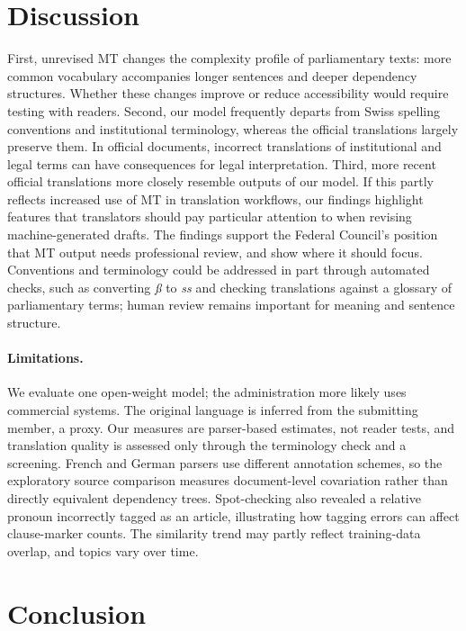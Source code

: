 \documentclass[11pt,a4paper]{article}
\begin{document}
\section{Discussion}
\label{sec:discussion}

First, unrevised MT changes the complexity profile of parliamentary texts: more common vocabulary accompanies longer sentences and deeper dependency structures. Whether these changes improve or reduce accessibility would require testing with readers. Second, our model frequently departs from Swiss spelling conventions and institutional terminology, whereas the official translations largely preserve them. In official documents, incorrect translations of institutional and legal terms can have consequences for legal interpretation. Third, more recent official translations more closely resemble outputs of our model. If this partly reflects increased use of MT in translation workflows, our findings highlight features that translators should pay particular attention to when revising machine-generated drafts. The findings support the Federal Council's position that MT output needs professional review, and show where it should focus. Conventions and terminology could be addressed in part through automated checks, such as converting \emph{\ss} to \emph{ss} and checking translations against a glossary of parliamentary terms; human review remains important for meaning and sentence structure.

\paragraph{Limitations.} We evaluate one open-weight model; the administration more likely uses commercial systems. The original language is inferred from the submitting member, a proxy. Our measures are parser-based estimates, not reader tests, and translation quality is assessed only through the terminology check and a screening. French and German parsers use different annotation schemes, so the exploratory source comparison measures document-level covariation rather than directly equivalent dependency trees. Spot-checking also revealed a relative pronoun incorrectly tagged as an article, illustrating how tagging errors can affect clause-marker counts. The similarity trend may partly reflect training-data overlap, and topics vary over time.

\section{Conclusion}
\end{document}

